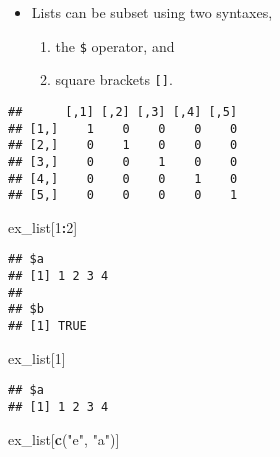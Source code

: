 \documentclass[]{book}
\newenvironment{Shaded}{\begin{snugshade}}{\end{snugshade}}
\newcommand{\KeywordTok}[1]{\textcolor[rgb]{0.13,0.29,0.53}{\textbf{#1}}}
\newcommand{\DecValTok}[1]{\textcolor[rgb]{0.00,0.00,0.81}{#1}}
\newcommand{\StringTok}[1]{\textcolor[rgb]{0.31,0.60,0.02}{#1}}
\newcommand{\CommentTok}[1]{\textcolor[rgb]{0.56,0.35,0.01}{\textit{#1}}}
\newcommand{\OperatorTok}[1]{\textcolor[rgb]{0.81,0.36,0.00}{\textbf{#1}}}
\newcommand{\NormalTok}[1]{#1}
\providecommand{\tightlist}{%
  \setlength{\itemsep}{0pt}\setlength{\parskip}{0pt}}
\begin{document}
\begin{itemize}
\tightlist
\item
  Lists can be subset using two syntaxes,

  \begin{enumerate}
  \def\labelenumi{\arabic{enumi}.}
  \tightlist
  \item
    the \texttt{\$} operator, and
  \item
    square brackets \texttt{{[}{]}}.
  \end{enumerate}
\end{itemize}

\begin{Shaded}
\end{Shaded}

\begin{verbatim}
##      [,1] [,2] [,3] [,4] [,5]
## [1,]    1    0    0    0    0
## [2,]    0    1    0    0    0
## [3,]    0    0    1    0    0
## [4,]    0    0    0    1    0
## [5,]    0    0    0    0    1
\end{verbatim}

\begin{Shaded}
\begin{Highlighting}[]
\NormalTok{ex_list[}\DecValTok{1}\OperatorTok{:}\DecValTok{2}\NormalTok{]}
\end{Highlighting}
\end{Shaded}

\begin{verbatim}
## $a
## [1] 1 2 3 4
## 
## $b
## [1] TRUE
\end{verbatim}

\begin{Shaded}
\begin{Highlighting}[]
\NormalTok{ex_list[}\DecValTok{1}\NormalTok{]}
\end{Highlighting}
\end{Shaded}

\begin{verbatim}
## $a
## [1] 1 2 3 4
\end{verbatim}

\begin{Shaded}
\begin{Highlighting}[]
\NormalTok{ex_list[}\KeywordTok{c}\NormalTok{(}\StringTok{"e"}\NormalTok{, }\StringTok{"a"}\NormalTok{)]}
\end{Highlighting}
\end{Shaded}
\end{document}
